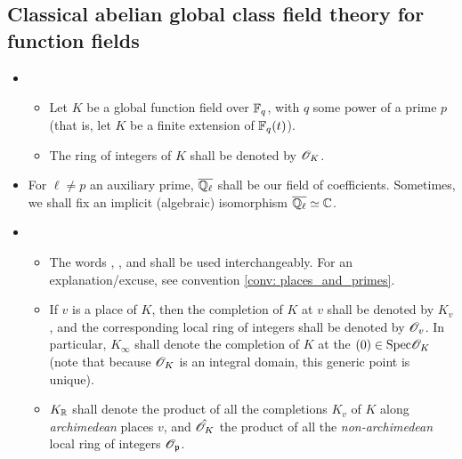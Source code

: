         \subsection{Classical abelian global class field theory for function fields}
            \begin{convention} \label{conv: classical_abelian_global_class_field_theory_conventions}
                \noindent
                \begin{itemize}
                    \item 
                        \begin{itemize}
                            \item Let $K$ be a global function field over $\mathbb{F}_q$, with $q$ some power of a prime $p$ (that is, let $K$ be a finite extension of $\mathbb{F}_q(t)$). 
                            \item The ring of integers of $K$ shall be denoted by $\mathscr{O}_K$.
                        \end{itemize}
                    \item For $\ell \not = p$ an auxiliary prime, $\overline{\mathbb{Q}_{\ell}}$ shall be our field of coefficients. Sometimes, we shall fix an implicit (algebraic) isomorphism $\overline{\mathbb{Q}_{\ell}} \simeq \mathbb{C}$.
                    \item 
                        \begin{itemize}
                            \item The words , , and  shall be used interchangeably. For an explanation/excuse, see convention \ref{conv: places_and_primes}. 
                            \item If $v$ is a place of $K$, then the completion of $K$ at $v$ shall be denoted by $K_v$, and the corresponding local ring of integers shall be denoted by $\mathscr{O}_v$. In particular, $K_{\infty}$ shall denote the completion of $K$ at the  $(0) \in \mathrm{Spec} \mathscr{O}_K$ (note that because $\mathscr{O}_K$ is an integral domain, this generic point is unique).
                            \item $K_{\mathbb{R}}$ shall denote the product of all the completions $K_v$ of $K$ along \textit{archimedean} places $v$, and $\hat{\mathscr{O}_K}$ the product of all the \textit{non-archimedean} local ring of integers $\mathscr{O}_{\mathfrak{p}}$. 
                        \end{itemize}
                \end{itemize}
            \end{convention}
            
